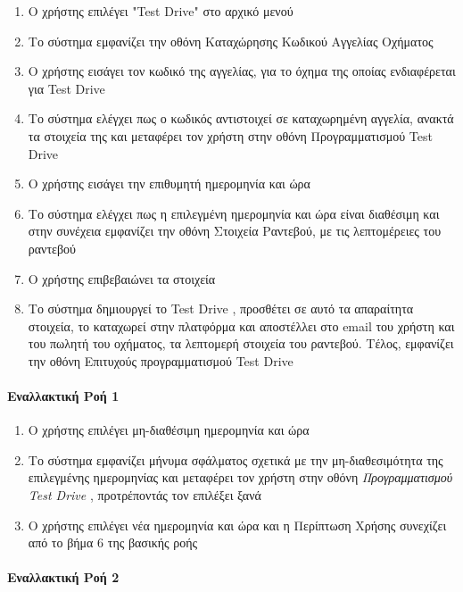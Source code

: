 \documentclass{../ol-softwaremanual}
\begin{document}
	\begin{enumerate}
		\item Ο χρήστης επιλέγει \en"Test Drive" \gr στο αρχικό μενού
		\item Το σύστημα εμφανίζει την οθόνη Καταχώρησης Κωδικού Αγγελίας Οχήματος
		\item Ο χρήστης εισάγει τον κωδικό της αγγελίας, για το όχημα της οποίας ενδιαφέρεται για \en Test Drive \gr
		\item Το σύστημα ελέγχει πως ο κωδικός αντιστοιχεί σε καταχωρημένη αγγελία, ανακτά τα στοιχεία της και μεταφέρει τον χρήστη στην οθόνη Προγραμματισμού \en Test Drive \gr
		\item Ο χρήστης εισάγει την επιθυμητή ημερομηνία και ώρα
		\item Το σύστημα ελέγχει πως η επιλεγμένη ημερομηνία και ώρα είναι διαθέσιμη και στην συνέχεια εμφανίζει την οθόνη Στοιχεία Ραντεβού, με τις λεπτομέρειες του ραντεβού
		\item Ο χρήστης επιβεβαιώνει τα στοιχεία
		\item Το σύστημα δημιουργεί το \en Test Drive \gr, προσθέτει σε αυτό τα απαραίτητα στοιχεία, το καταχωρεί στην πλατφόρμα και αποστέλλει στο \en email \gr του χρήστη και του πωλητή του οχήματος, τα λεπτομερή στοιχεία του ραντεβού. Τέλος, εμφανίζει την οθόνη Επιτυχούς προγραμματισμού \en Test Drive \gr 
	\end{enumerate}
	
	\paragraph{Εναλλακτική Ροή 1}
	
	\begin{enumerate}
		\item Ο χρήστης επιλέγει μη-διαθέσιμη ημερομηνία και ώρα
		\item Το σύστημα εμφανίζει μήνυμα σφάλματος σχετικά με την μη-διαθεσιμότητα της επιλεγμένης ημερομηνίας και μεταφέρει τον χρήστη στην οθόνη \textit{Προγραμματισμού \en Test Drive \gr}, προτρέποντάς τον επιλέξει ξανά
		\item Ο χρήστης επιλέγει νέα ημερομηνία και ώρα και η Περίπτωση Χρήσης συνεχίζει από το βήμα 6 της βασικής ροής
	\end{enumerate}
	
	
	\paragraph{Εναλλακτική Ροή 2}
	
\end{document}
